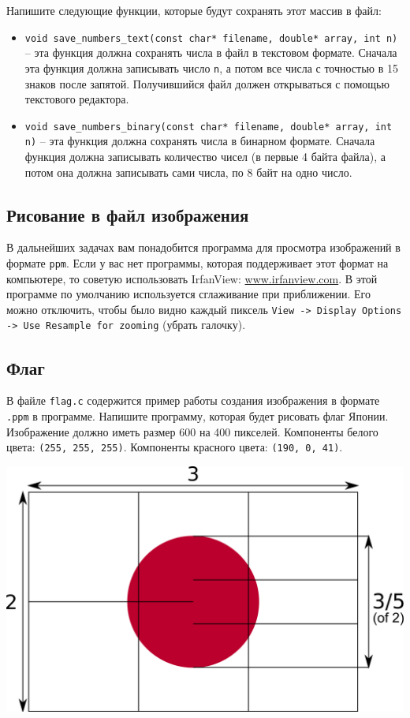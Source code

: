 \documentclass{article}
\begin{document}
Напишите следующие функции, которые будут сохранять этот массив в файл:
\begin{itemize}
\item \texttt{void save\_numbers\_text(const char* filename, double* array, int n)} -- эта функция должна сохранять числа в файл в текстовом формате. Сначала эта функция должна записывать число \texttt{n}, а потом все числа с точностью в 15 знаков после запятой. Получившийся файл должен открываться с помощью текстового редактора.
\item \texttt{void save\_numbers\_binary(const char* filename, double* array, int n)} -- эта функция должна сохранять числа в бинарном формате. Сначала функция должна записывать количество чисел (в первые 4 байта файла), а потом она должна записывать сами числа, по 8 байт на одно число. 
\end{itemize}

\newpage
\subsection*{Рисование в файл изображения}
В дальнейших задачах вам понадобится программа для просмотра изображений в формате \texttt{ppm}. Если у вас нет программы, которая поддерживает этот  формат на компьютере, то советую использовать IrfanView: \href{https://www.irfanview.com/}{www.irfanview.com}.
В этой программе по умолчанию используется сглаживание при приближении. Его можно отключить, чтобы было видно каждый пиксель \texttt{View -> Display Options -> Use Resample for zooming} (убрать галочку).

\subsection{Флаг} 
В файле \texttt{flag.c} содержится пример работы создания изображения в формате \texttt{.ppm} в программе. Напишите программу, которая будет рисовать флаг Японии. Изображение должно иметь размер 600 на 400 пикселей. Компоненты белого цвета: \texttt{(255, 255, 255)}. Компоненты красного цвета: \texttt{(190, 0, 41)}.
\begin{center}
\includegraphics[scale=0.15]{../images/japanflag.png}
\end{center}
\end{document}
